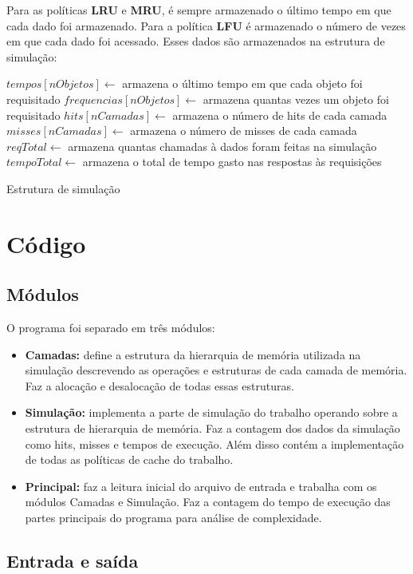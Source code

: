 \documentclass[12pt]{article}
\begin{document}
Para as políticas \textbf{LRU} e \textbf{MRU}, é sempre armazenado o último tempo em que cada dado foi armazenado. Para a política \textbf{LFU} é armazenado o número de vezes em que cada dado foi acessado. Esses dados são armazenados na estrutura de simulação:

\begin{algorithm}[h!]
\begin{footnotesize}
$tempos[nObjetos] \longleftarrow$ armazena o último tempo em que cada objeto foi requisitado\;
$frequencias[nObjetos] \longleftarrow$ armazena quantas vezes um objeto foi requisitado\;
$hits[nCamadas] \longleftarrow$ armazena o número de hits de cada camada\;
$misses[nCamadas] \longleftarrow$ armazena o número de misses de cada camada\;
$reqTotal \longleftarrow$ armazena quantas chamadas à dados foram feitas na simulação\;
$tempoTotal \longleftarrow$ armazena o total de tempo gasto nas respostas às requisições\;
\caption{Estrutura de simulação}
\end{footnotesize}
\end{algorithm}

\section{Código}

\subsection{Módulos}
O programa foi separado em três módulos:
\begin{itemize}
\item \textbf{Camadas:} define a estrutura da hierarquia de memória utilizada na simulação descrevendo as operações e estruturas de cada camada de memória. Faz a alocação e desalocação de todas essas estruturas.
\item \textbf{Simulação:} implementa a parte de simulação do trabalho operando sobre a estrutura de hierarquia de memória. Faz a contagem dos dados da simulação como hits, misses e tempos de execução. Além disso contém a implementação de todas as políticas de cache do trabalho.
\item \textbf{Principal:} faz a leitura inicial do arquivo de entrada e trabalha com os módulos Camadas e Simulação. Faz a contagem do tempo de execução das partes principais do programa para análise de complexidade.
\end{itemize}

\subsection{Entrada e saída}
\end{document}
